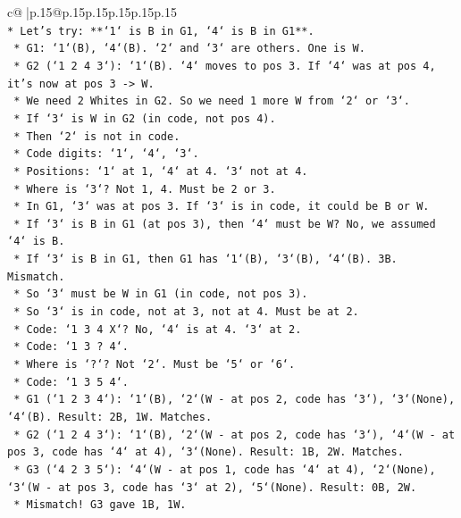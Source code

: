 \documentclass{article}
\begin{document}
{\begin{supertabular}{c@{$\;$}|p{.15\linewidth}@{}p{.15\linewidth}p{.15\linewidth}p{.15\linewidth}p{.15\linewidth}p{.15\linewidth}}
{{{\\ 
\texttt{*   Let's try: **`1` is B in G1, `4` is B in G1**.} \\
\texttt{    *   G1: `1`(B), `4`(B). `2` and `3` are others. One is W.} \\
\texttt{    *   G2 (`1 2 4 3`): `1`(B). `4` moves to pos 3. If `4` was at pos 4, it's now at pos 3 {-}> W.} \\
\texttt{    *   We need 2 Whites in G2. So we need 1 more W from `2` or `3`.} \\
\texttt{    *   If `3` is W in G2 (in code, not pos 4).} \\
\texttt{    *   Then `2` is not in code.} \\
\texttt{    *   Code digits: `1`, `4`, `3`.} \\
\texttt{    *   Positions: `1` at 1, `4` at 4. `3` not at 4.} \\
\texttt{    *   Where is `3`? Not 1, 4. Must be 2 or 3.} \\
\texttt{    *   In G1, `3` was at pos 3. If `3` is in code, it could be B or W.} \\
\texttt{    *   If `3` is B in G1 (at pos 3), then `4` must be W? No, we assumed `4` is B.} \\
\texttt{    *   If `3` is B in G1, then G1 has `1`(B), `3`(B), `4`(B). 3B. Mismatch.} \\
\texttt{    *   So `3` must be W in G1 (in code, not pos 3).} \\
\texttt{    *   So `3` is in code, not at 3, not at 4. Must be at 2.} \\
\texttt{    *   Code: `1 3 4 X`? No, `4` is at 4. `3` at 2.} \\
\texttt{    *   Code: `1 3 ? 4`.} \\
\texttt{    *   Where is `?`? Not `2`. Must be `5` or `6`.} \\
\texttt{    *   Code: `1 3 5 4`.} \\
\texttt{        *   G1 (`1 2 3 4`): `1`(B), `2`(W {-} at pos 2, code has `3`), `3`(None), `4`(B). Result: 2B, 1W. Matches.} \\
\texttt{        *   G2 (`1 2 4 3`): `1`(B), `2`(W {-} at pos 2, code has `3`), `4`(W {-} at pos 3, code has `4` at 4), `3`(None). Result: 1B, 2W. Matches.} \\
\texttt{        *   G3 (`4 2 3 5`): `4`(W {-} at pos 1, code has `4` at 4), `2`(None), `3`(W {-} at pos 3, code has `3` at 2), `5`(None). Result: 0B, 2W.} \\
\texttt{        *   Mismatch! G3 gave 1B, 1W.} \\
}}}
\end{supertabular}}
\end{document}
